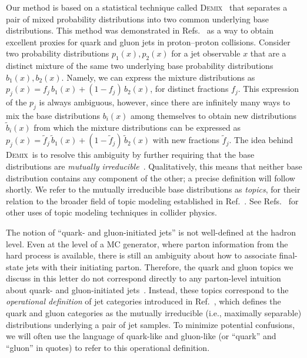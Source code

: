 \documentclass[aps,prl,twocolumn,preprintnumbers,showpacs,floatfix,nofootinbib]{revtex4-1}
\newcommand*{\demix}{\textsc{Demix}}
\newcommand{\Refc}[1]{Ref.~\cite{#1}}
\newcommand{\Refsc}[1]{Refs.~\cite{#1}}
\begin{document}
Our method is based on a statistical technique called \demix~\cite{KatzEtAlDemix} that separates a pair of mixed probability distributions into two common underlying base distributions.
%
This method was demonstrated in \Refsc{Metodiev:2018ftz,Komiske:2018vkc} as a way to obtain excellent proxies for quark and gluon jets in proton--proton collisions.
%
Consider two probability distributions $p_1(x), p_2(x)$ for a jet observable $x$ that are a distinct mixture of the same two underlying base probability distributions $b_1(x), b_2(x)$.
%
Namely, we can express the mixture distributions as $p_j(x) = f_j \, b_1(x) + (1 - f_j) \, b_2(x)$, for distinct fractions $f_j$.
%
This expression of the $p_j$ is always ambiguous, however, since there are infinitely many ways to mix the base distributions $b_i(x)$ among themselves to obtain new distributions $\tilde{b}_i(x)$ from which the mixture distributions can be expressed as $p_j(x) = \tilde{f}_j \, \tilde{b}_1(x) + (1 - \tilde{f}_j) \, \tilde{b}_2(x)$ with new fractions $\tilde{f}_j$.
%
The idea behind \demix\ is to resolve this ambiguity by further requiring that the base distributions are \emph{mutually irreducible}~\cite{blanchard2016}.
%
Qualitatively, this means that neither base distribution contains any component of the other; a precise definition will follow shortly.
%
We refer to the mutually irreducible base distributions as \emph{topics}, for their relation to the broader field of topic modeling established in \Refc{Metodiev:2018ftz}.
%
See \Refsc{Dillon:2019cqt,Alvarez:2019knh,Dillon:2020quc} for other uses of topic modeling techniques in collider physics.


The notion of ``quark- and gluon-initiated jets'' is not well-defined at the hadron level.
%
Even at the level of a MC generator, where parton information from the hard process is available, there is still an ambiguity about how to associate final-state jets with their initiating parton.
%
Therefore, the quark and gluon topics we discuss in this letter do not correspond directly to any parton-level intuition about quark- and gluon-initiated jets~\cite{Gras:2017jty}.
%
Instead, these topics correspond to the \emph{operational definition} of jet categories introduced in \Refc{Komiske:2018vkc}, which defines the quark and gluon categories as the mutually irreducible (i.e., maximally separable) distributions underlying a pair of jet samples.
%
To minimize potential confusions, we will often use the language of quark-like and gluon-like (or ``quark'' and ``gluon'' in quotes) to refer to this operational definition.
\end{document}
